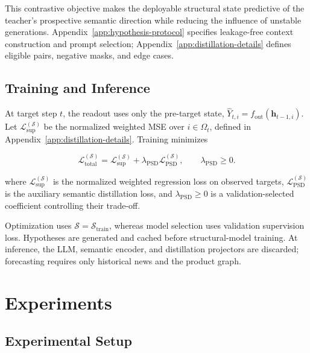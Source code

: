 \documentclass[letterpaper]{article} %
\begin{document}
This contrastive objective makes the deployable structural state predictive of the teacher's prospective semantic direction while reducing the influence of unstable generations. Appendix~\ref{app:hypothesis-protocol} specifies leakage-free context construction and prompt selection; Appendix~\ref{app:distillation-details} defines eligible pairs, negative masks, and edge cases.

\subsection{Training and Inference}

At target step \(t\), the readout uses only the pre-target state, \(\widehat Y_{t,i}=f_{\mathrm{out}}(\mathbf h_{t-1,i})\). Let \(\mathcal L_{\mathrm{sup}}^{(\mathcal S)}\) be the normalized weighted MSE over \(i\in\Omega_t\), defined in Appendix~\ref{app:distillation-details}. Training minimizes

\begin{equation}
\mathcal L_{\mathrm{total}}^{(\mathcal S)}
=
\mathcal L_{\mathrm{sup}}^{(\mathcal S)}
+\lambda_{\mathrm{PSD}}\mathcal L_{\mathrm{PSD}}^{(\mathcal S)},
\qquad \lambda_{\mathrm{PSD}}\geq0.
\label{eq:joint-objective}
\end{equation}

where \(\mathcal L_{\mathrm{sup}}^{(\mathcal S)}\) is the normalized weighted regression loss on observed targets, \(\mathcal L_{\mathrm{PSD}}^{(\mathcal S)}\) is the auxiliary semantic distillation loss, and \(\lambda_{\mathrm{PSD}}\geq0\) is a validation-selected coefficient controlling their trade-off.

Optimization uses \(\mathcal S=\mathcal S_{\mathrm{train}}\), whereas model selection uses validation supervision loss. Hypotheses are generated and cached before structural-model training. At inference, the LLM, semantic encoder, and distillation projectors are discarded; forecasting requires only historical news and the product graph.

\section{Experiments}
\label{sec:experiments}

\subsection{Experimental Setup}
\end{document}
